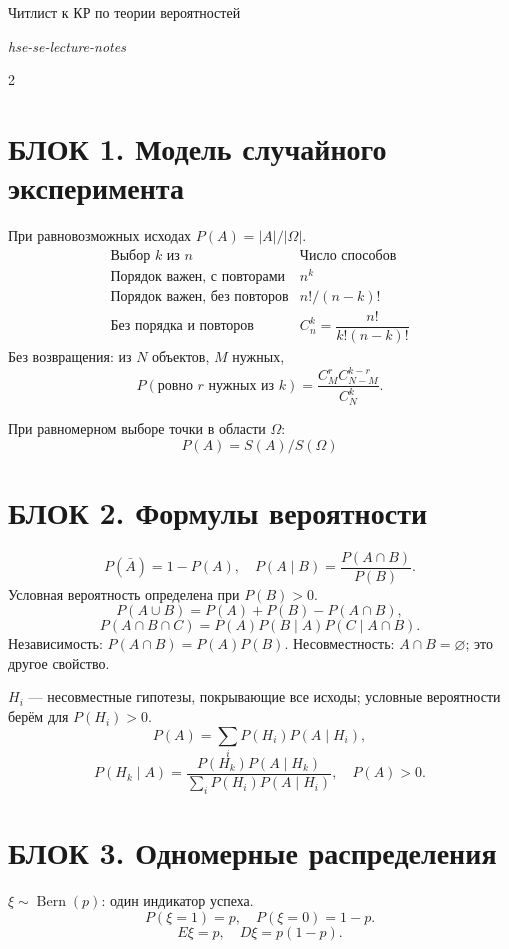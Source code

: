 \documentclass[a4paper,10pt]{article}
\newcommand{\blk}[2]{\section{БЛОК #1. #2}}
\begin{document}
\fontsize{11}{13}\selectfont
\everymath{\textstyle}
\setlength{\parskip}{3pt}
\setlength{\abovedisplayskip}{3pt}
\setlength{\belowdisplayskip}{3pt}
\setlength{\abovedisplayshortskip}{2pt}
\setlength{\belowdisplayshortskip}{2pt}
{\centering\large Читлист к КР по теории вероятностей\par}
{\centering\footnotesize\itshape hse-se-lecture-notes\par}
\begin{multicols}{2}
\raggedcolumns
\blk{1}{Модель случайного эксперимента}
\begin{definition}
При равновозможных исходах $P(A)=|A|/|\Omega|$.
\[
\begin{array}{c|c}
\text{Выбор }k\text{ из }n&\text{Число способов}\\\hline
\text{Порядок важен, с повторами}&n^k\\
\text{Порядок важен, без повторов}&n!/(n-k)!\\
\text{Без порядка и повторов}&C_n^k=\dfrac{n!}{k!(n-k)!}
\end{array}
\]
Без возвращения: из $N$ объектов, $M$ нужных,
\[
P(\text{ровно }r\text{ нужных из }k)
=\frac{C_M^rC_{N-M}^{k-r}}{C_N^k}.
\]
\end{definition}
\begin{definition}
При равномерном выборе точки в области $\Omega$:
\[
P(A)=S(A)/S(\Omega)
\]
\end{definition}
\blk{2}{Формулы вероятности}
\begin{theorem}
\[
P(\bar A)=1-P(A),\quad P(A\mid B)=\frac{P(A\cap B)}{P(B)}.
\]
Условная вероятность определена при $P(B)>0$.
\[
P(A\cup B)=P(A)+P(B)-P(A\cap B),
\]
\[
P(A\cap B\cap C)=P(A)P(B\mid A)P(C\mid A\cap B).
\]
Независимость: $P(A\cap B)=P(A)P(B)$.
Несовместность: $A\cap B=\varnothing$; это другое свойство.
\end{theorem}
\begin{theorem}
$H_i$ --- несовместные гипотезы, покрывающие все исходы; условные вероятности берём для $P(H_i)>0$.
\[
P(A)=\sum_iP(H_i)P(A\mid H_i),
\]
\[
P(H_k\mid A)=\frac{P(H_k)P(A\mid H_k)}
{\sum_iP(H_i)P(A\mid H_i)},\quad P(A)>0.
\]
\end{theorem}
\columnbreak
\blk{3}{Одномерные распределения}
\begin{definition}
$\xi\sim\operatorname{Bern}(p)$: один индикатор успеха.
\[
P(\xi=1)=p,\quad P(\xi=0)=1-p.
\]
\[
E\xi=p,\quad D\xi=p(1-p).
\]
\end{definition}
\end{multicols}
\end{document}
